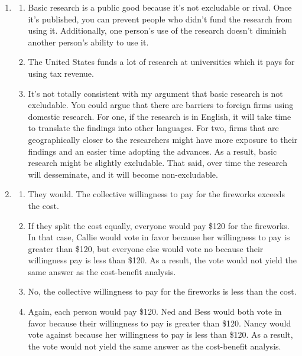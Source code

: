 \documentclass{article}
\begin{document}
\begin{enumerate}
\begin{enumerate}
	\end{enumerate}
	
\item

	\begin{enumerate}
	
	\item Basic research is a public good because it's not excludable or rival. Once it's published, you can prevent people who didn't fund the research from using it. Additionally, one person's use of the research doesn't diminish another person's ability to use it.
	
	\item The United States funds a lot of research at universities which it pays for using tax revenue.
	
	\item It's not totally consistent with my argument that basic research is not excludable. You could argue that there are barriers to foreign firms using domestic research. For one, if the research is in English, it will take time to translate the findings into other languages. For two, firms that are geographically closer to the researchers might have more exposure to their findings and an easier time adopting the advances. As a result, basic research might be slightly excludable. That said, over time the research will desseminate, and it will become non-excludable. 
	
	\end{enumerate}
	
\item

	\begin{enumerate}
	
	\item They would. The collective willingness to pay for the fireworks exceeds the cost.
	
	\item If they split the cost equally, everyone would pay \$120 for the fireworks. In that case, Callie would vote in favor because her willingness to pay is greater than \$120, but everyone else would vote no because their willingness pay is less than \$120. As a result, the vote would not yield the same answer as the cost-benefit analysis.
	
	\item No, the collective willingness to pay for the fireworks is less than the cost.
	
	\item Again, each person would pay \$120. Ned and Bess would both vote in favor because their willingness to pay is greater than \$120. Nancy would vote against because her willingness to pay is less than \$120. As a result, the vote would not yield the same answer as the cost-benefit analysis.
	

\end{enumerate}
\end{enumerate}
\end{document}
